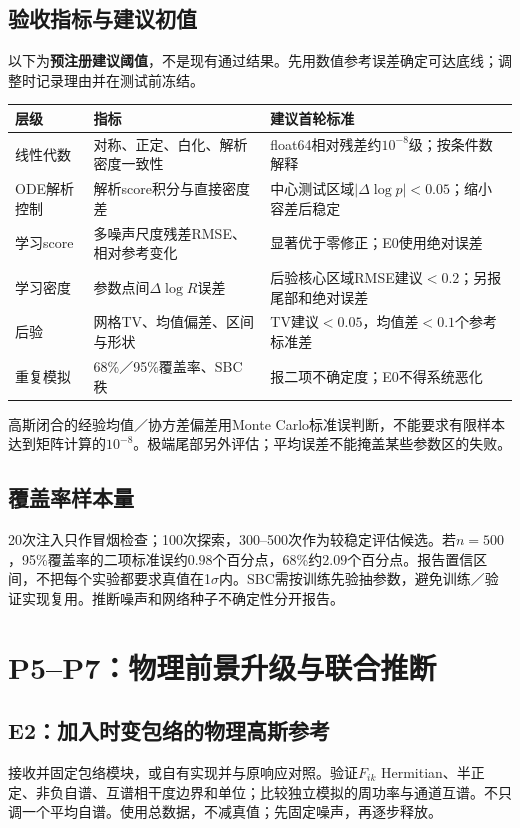 \documentclass[UTF8,fontset=none,a4paper,11pt]{ctexart}
\begin{document}
\subsection{验收指标与建议初值}
以下为\textbf{预注册建议阈值}，不是现有通过结果。先用数值参考误差确定可达底线；调整时记录理由并在测试前冻结。
\par\noindent\begin{tabularx}{\linewidth}{p{31mm}YY}\toprule
层级 & 指标 & 建议首轮标准\\\midrule
线性代数 & 对称、正定、白化、解析密度一致性 & float64相对残差约$10^{-8}$级；按条件数解释\\
ODE解析控制 & 解析score积分与直接密度差 & 中心测试区域$|\Delta\log p|<0.05$；缩小容差后稳定\\
学习score & 多噪声尺度残差RMSE、相对参考变化 & 显著优于零修正；E0使用绝对误差\\
学习密度 & 参数点间$\Delta\log R$误差 & 后验核心区域RMSE建议$<0.2$；另报尾部和绝对误差\\
后验 & 网格TV、均值偏差、区间与形状 & TV建议$<0.05$，均值差$<0.1$个参考标准差\\
重复模拟 & 68\%／95\%覆盖率、SBC秩 & 报二项不确定度；E0不得系统恶化\\\bottomrule
\end{tabularx}\par
高斯闭合的经验均值／协方差偏差用Monte Carlo标准误判断，不能要求有限样本达到矩阵计算的$10^{-8}$。极端尾部另外评估；平均误差不能掩盖某些参数区的失败。
\subsection{覆盖率样本量}
20次注入只作冒烟检查；100次探索，300--500次作为较稳定评估候选。若$n=500$，95\%覆盖率的二项标准误约$0.98$个百分点，68\%约$2.09$个百分点。报告置信区间，不把每个实验都要求真值在1$\sigma$内。SBC需按训练先验抽参数，避免训练／验证实现复用。推断噪声和网络种子不确定性分开报告。
\clearpage

\section{P5--P7：物理前景升级与联合推断}
\subsection{E2：加入时变包络的物理高斯参考}
接收并固定包络模块，或自有实现并与原响应对照。验证$F_{ik}$ Hermitian、半正定、非负自谱、互谱相干度边界和单位；比较独立模拟的周功率与通道互谱。不只调一个平均自谱。使用总数据，不减真值；先固定噪声，再逐步释放。
\end{document}
